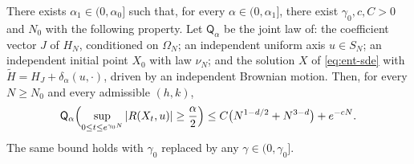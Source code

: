 \begin{proposition}
\label{prop:ent-truncated}
There exists $\alpha_1\in(0,\alpha_0]$ such that, for every
$\alpha\in(0,\alpha_1]$, there exist $\gamma_0,c,C>0$ and $N_0$ with the
following property. Let $\mathsf Q_\alpha$ be the joint law of: the
coefficient vector $J$ of $H_N$, conditioned on $\Omega_N$; an independent
uniform axis $u\in S_N$; an independent initial point $X_0$ with law
$\nu_N$; and the solution $X$ of \eqref{eq:ent-sde} with
$\widetilde H=H_J+\delta_\alpha(u,\cdot)$, driven by an independent Brownian
motion. Then, for every $N\ge N_0$ and every admissible $(h,k)$,
\begin{equation}\label{eq:ent-truncated}
 \mathsf Q_\alpha\Bigl(\sup_{0\le t\le e^{\gamma_0N}}|R(X_t,u)|
 \ge\frac\alpha2\Bigr)\le C\bigl(N^{1-d/2}+N^{3-d}\bigr)+e^{-cN}.
\end{equation}
The same bound holds with $\gamma_0$ replaced by any $\gamma\in(0,\gamma_0]$.
\end{proposition}

